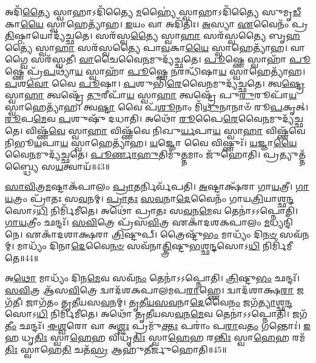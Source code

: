 𑌅𑌦𑌿᳴\-\ul{𑌤𑍍𑌯𑍈} 𑌸𑍍𑌵𑌾𑌹𑌾\-𑌽𑌦𑌿᳴𑌤𑍍𑌯𑍈 \ul{𑌮}\-𑌹𑍍𑌯𑍈॑ 𑌸𑍍𑌵𑌾𑌹𑌾\-𑌽𑌦𑌿᳴𑌤𑍍𑌯𑍈 𑌸𑍁𑌮𑍃\-\ul{𑌡𑍀}\-𑌕𑌾\-\ul{𑌯𑍈} 𑌸𑍍𑌵𑌾𑌹𑍇𑌤𑍍𑌯𑌾᳴𑌹।
\-\ul{𑌇}\-𑌯𑌂 𑌵𑌾 𑌅𑌦𑌿᳴𑌤𑌿𑌃।
\-\ul{𑌅}\-𑌸𑍍𑌯𑌾 \ul{𑌏}\-𑌵𑍈𑌨𑌂᳴ 𑌪𑍍𑌰\-\ul{𑌤𑌿}\-𑌷𑍍𑌠𑌾𑌯𑍋𑌦𑍍𑌯᳴𑌚𑍍𑌛𑌤𑍇।
𑌸𑌰᳴𑌸𑍍𑌵\-\ul{𑌤𑍍𑌯𑍈} 𑌸𑍍𑌵𑌾\-\ul{𑌹𑌾} 𑌸𑌰᳴𑌸𑍍𑌵𑌤𑍍𑌯𑍈 𑌬𑍃\-\ul{𑌹}\-𑌤𑍍𑌯𑍈॑ 𑌸𑍍𑌵𑌾\-\ul{𑌹𑌾} 𑌸𑌰᳴𑌸𑍍𑌵𑌤𑍍𑌯𑍈 𑌪𑌾\-\ul{𑌵}\-𑌕𑌾\-\ul{𑌯𑍈} 𑌸𑍍𑌵𑌾𑌹𑍇𑌤𑍍𑌯𑌾᳴𑌹।
𑌵𑌾𑌗𑍍𑌵𑍈 𑌸𑌰᳴𑌸𑍍𑌵𑌤𑍀।
\-\ul{𑌵𑌾}\-𑌚𑍈𑌵𑍈\-\ul{𑌨}\-𑌮𑍁𑌦𑍍𑌯᳴𑌚𑍍𑌛𑌤𑍇।
\-\ul{𑌪𑍂}\-𑌷𑍍𑌣𑍇 𑌸𑍍𑌵𑌾𑌹𑌾᳴ \ul{𑌪𑍂}\-𑌷𑍍𑌣𑍇 𑌪𑍍𑌰᳴\-\ul{𑌪}\-𑌥𑍍𑌯𑌾᳴\-\ul{𑌯} 𑌸𑍍𑌵𑌾𑌹𑌾᳴ \ul{𑌪𑍂}\-𑌷𑍍𑌣𑍇 \ul{𑌨}\-𑌰𑌨𑍍𑌧𑌿᳴𑌷𑌾\-\ul{𑌯} 𑌸𑍍𑌵𑌾𑌹𑍇𑌤𑍍𑌯𑌾᳴𑌹।
\-\ul{𑌪}\-𑌶\-\ul{𑌵𑍋} 𑌵𑍈 \ul{𑌪𑍂}\-𑌷𑌾।
\-\ul{𑌪}\-𑌶𑍁𑌭𑌿᳴\-\ul{𑌰𑍇}\-𑌵𑍈\-\ul{𑌨}\-𑌮𑍁𑌦𑍍𑌯᳴𑌚𑍍𑌛𑌤𑍇।
𑌤𑍍𑌵\-\ul{𑌷𑍍𑌟𑍍𑌰𑍇} 𑌸𑍍𑌵𑌾\-\ul{𑌹𑌾} 𑌤𑍍𑌵𑌷𑍍𑌟𑍍𑌰𑍇᳴ \ul{𑌤𑍁}\-𑌰𑍀𑌪𑌾᳴\-\ul{𑌯} 𑌸𑍍𑌵𑌾\-\ul{𑌹𑌾} 𑌤𑍍𑌵𑌷𑍍𑌟𑍍𑌰𑍇᳴ 𑌪𑍁\-\ul{𑌰𑍁}\-𑌰𑍂𑌪𑌾᳴\-\ul{𑌯} 𑌸𑍍𑌵𑌾𑌹𑍇𑌤𑍍𑌯𑌾᳴𑌹।
𑌤𑍍𑌵\-\ul{𑌷𑍍𑌟𑌾} 𑌵𑍈 𑌪᳴\-\ul{𑌶𑍂}\-𑌨𑌾𑌂 𑌮𑌿᳴\-\ul{𑌥𑍁}\-𑌨𑌾𑌨𑌾𑍞᳴ 𑌰𑍂\-\ul{𑌪}\-𑌕𑍃𑌤𑍍।
\-\ul{𑌰𑍂}\-𑌪\-\ul{𑌮𑍇}\-𑌵 \ul{𑌪}\-𑌶𑍁𑌷𑍁᳴ 𑌦𑌧𑌾𑌤𑌿।
𑌅𑌥𑍋᳴ \ul{𑌰𑍂}\-𑌪𑍈\-\ul{𑌰𑍇}\-𑌵𑍈\-\ul{𑌨}\-𑌮𑍁𑌦𑍍𑌯᳴𑌚𑍍𑌛𑌤𑍇।
𑌵𑌿𑌷𑍍𑌣᳴\-\ul{𑌵𑍇} 𑌸𑍍𑌵𑌾\-\ul{𑌹𑌾} 𑌵𑌿𑌷𑍍𑌣᳴𑌵𑍇 𑌨𑌿𑌖𑍁\-\ul{𑌰𑍍𑌯}\-𑌪𑌾\-\ul{𑌯} 𑌸𑍍𑌵𑌾\-\ul{𑌹𑌾} 𑌵𑌿𑌷𑍍𑌣᳴𑌵𑍇 𑌨𑌿𑌭𑍂\-\ul{𑌯}\-𑌪𑌾\-\ul{𑌯} 𑌸𑍍𑌵𑌾𑌹𑍇𑌤𑍍𑌯𑌾᳴𑌹।
\-\ul{𑌯}\-𑌜𑍍𑌞𑍋 𑌵𑍈 𑌵𑌿𑌷𑍍𑌣𑍁𑌃᳴।
\-\ul{𑌯}\-𑌜𑍍𑌞𑌾\-\ul{𑌯𑍈}\-𑌵𑍈\-\ul{𑌨}\-𑌮𑍁𑌦𑍍𑌯᳴𑌚𑍍𑌛𑌤𑍇।
\-\ul{𑌪𑍂}\-\-\ul{𑌰𑍍𑌣𑌾}\-\-\ul{𑌹𑍁}\-𑌤𑌿𑌮𑍁᳴\-\ul{𑌤𑍍𑌤}\-𑌮𑌾𑌂 𑌜𑍁᳴𑌹𑍋𑌤𑌿।
𑌪𑍍𑌰𑌤𑍍𑌯𑍁𑌤𑍍𑌤᳴𑌬𑍍𑌧𑍍𑌯𑍈 𑌸\-\ul{𑌯}\-𑌤𑍍𑌵𑌾𑌯᳴॥43॥\anuvakamend[\-\ul{𑌯}\-\-\ul{𑌚𑍍𑌛}\-\-\ul{𑌤𑍇} \ul{𑌪𑍁}\-\-\ul{𑌰𑍁}\-𑌰𑍂𑌪𑌾᳴\-\ul{𑌯} 𑌸𑍍𑌵𑌾𑌹𑍇𑌤𑍍𑌯𑌾᳴\-\ul{𑌹𑌾}\-𑌷𑍍𑌟𑍗 𑌚᳴]

\-\ul{𑌸𑌾}\-\-\ul{𑌵𑌿}\-𑌤𑍍𑌰\-\ul{𑌮}\-𑌷𑍍𑌟𑌾\-𑌕᳴𑌪𑌾𑌲𑌂 \ul{𑌪𑍍𑌰𑌾}\-𑌤𑌰𑍍𑌨𑌿𑌰𑍍𑌵᳴𑌪𑌤𑌿।
\-\ul{𑌅}\-𑌷𑍍𑌟𑌾𑌕𑍍𑌷᳴𑌰𑌾 𑌗𑌾\-\ul{𑌯}\-𑌤𑍍𑌰𑍀।
\-\ul{𑌗𑌾}\-\-\ul{𑌯}\-𑌤𑍍𑌰𑌂 𑌪𑍍𑌰𑌾᳴𑌤𑌃 𑌸\-\ul{𑌵}\-𑌨𑌮𑍍।
\-\ul{𑌪𑍍𑌰𑌾}\-\-\ul{𑌤𑌃} \ul{𑌸}\-\-\ul{𑌵}\-𑌨𑌾\-\ul{𑌦𑍇}\-𑌵𑍈𑌨𑌂᳴ 𑌗𑌾𑌯\-\ul{𑌤𑍍𑌰𑌿}\-𑌯𑌾𑌶𑍍𑌛\-\ul{𑌨𑍍𑌦}\-𑌸𑍋\-𑌽\-\ul{𑌧𑌿} 𑌨𑌿𑌰𑍍𑌮𑌿᳴𑌮𑍀𑌤𑍇।
𑌅𑌥𑍋॑ 𑌪𑍍𑌰𑌾𑌤𑌃 𑌸\-\ul{𑌵}\-𑌨\-\ul{𑌮𑍇}\-𑌵 𑌤𑍇𑌨𑌾॑𑌽𑌽𑌪𑍍𑌨𑍋𑌤𑌿।
\-\ul{𑌗𑌾}\-\-\ul{𑌯}\-𑌤𑍍𑌰𑍀𑌂 𑌛𑌨𑍍𑌦𑌃᳴।
\-\ul{𑌸}\-\-\ul{𑌵𑌿}\-𑌤𑍍𑌰𑍇 𑌪𑍍𑌰᳴𑌸\-\ul{𑌵𑌿}\-𑌤𑍍𑌰 𑌏𑌕𑌾᳴\-𑌦𑌶\-𑌕𑌪𑌾𑌲𑌂 \ul{𑌮}\-𑌧𑍍𑌯𑌨𑍍𑌦𑌿᳴𑌨𑍇।
𑌏𑌕𑌾᳴𑌦𑌶𑌾𑌕𑍍𑌷𑌰𑌾 \ul{𑌤𑍍𑌰𑌿}\-𑌷𑍍𑌟𑍁𑌪𑍍।
𑌤𑍍𑌰𑍈𑌷𑍍𑌟𑍁᳴\-\ul{𑌭𑌂} 𑌮𑌾𑌧𑍍𑌯𑌂᳴ 𑌦𑌿\-\ul{𑌨}\-\-\ul{𑍞} 𑌸𑌵᳴𑌨𑌮𑍍।
𑌮𑌾𑌧𑍍𑌯𑌂᳴ 𑌦𑌿𑌨𑌾\-\ul{𑌦𑍇}\-𑌵𑍈\-\ul{𑌨}\-\-\ul{𑍞} 𑌸𑌵᳴𑌨𑌾\-\ul{𑌤𑍍𑌤𑍍𑌰𑌿}\-𑌷𑍍𑌟𑍁\-\ul{𑌭}\-𑌶𑍍𑌛\-\ul{𑌨𑍍𑌦}\-𑌸𑍋𑌽\-\ul{𑌧𑌿} 𑌨𑌿𑌰𑍍𑌮𑌿᳴𑌮𑍀𑌤𑍇॥44॥

𑌅\-\ul{𑌥𑍋} 𑌮𑌾𑌧𑍍𑌯𑌂᳴ 𑌦𑌿𑌨\-\ul{𑌮𑍇}\-𑌵 𑌸𑌵᳴\-\ul{𑌨𑌂} 𑌤𑍇𑌨𑌾॑𑌽𑌽𑌪𑍍𑌨𑍋𑌤𑌿।
\-\ul{𑌤𑍍𑌰𑌿}\-𑌷𑍍𑌟𑍁\-\ul{𑌭𑌂} 𑌛𑌨𑍍𑌦𑌃᳴।
\-\ul{𑌸}\-\-\ul{𑌵𑌿}\-𑌤𑍍𑌰 𑌆᳴𑌸\-\ul{𑌵𑌿}\-𑌤𑍍𑌰𑍇 𑌦𑍍𑌵𑌾𑌦᳴𑌶𑌕𑌪𑌾𑌲𑌮𑌪\-\ul{𑌰𑌾}\-𑌹𑍍𑌣𑍇।
𑌦𑍍𑌵𑌾𑌦᳴𑌶𑌾𑌕𑍍𑌷\-\ul{𑌰𑌾} 𑌜𑌗᳴𑌤𑍀।
𑌜𑌾𑌗᳴𑌤𑌂 𑌤𑍃𑌤𑍀𑌯𑌸\-\ul{𑌵}\-𑌨𑌮𑍍।
\-\ul{𑌤𑍃}\-\-\ul{𑌤𑍀}\-\-\ul{𑌯}\-\-\ul{𑌸}\-\-\ul{𑌵}\-𑌨𑌾\-\ul{𑌦𑍇}\-𑌵𑍈\-\ul{𑌨𑌂} 𑌜𑌗᳴\-\ul{𑌤𑍍𑌯𑌾}\-𑌶𑍍𑌛\-\ul{𑌨𑍍𑌦}\-𑌸𑍋𑌽\-\ul{𑌧𑌿} 𑌨𑌿𑌰𑍍𑌮𑌿᳴𑌮𑍀𑌤𑍇।
𑌅𑌥𑍋᳴ 𑌤𑍃𑌤𑍀𑌯𑌸\-\ul{𑌵}\-𑌨\-\ul{𑌮𑍇}\-𑌵 𑌤𑍇𑌨𑌾॑𑌽𑌽𑌪𑍍𑌨𑍋𑌤𑌿।
𑌜𑌗᳴\-\ul{𑌤𑍀𑌂} 𑌛𑌨𑍍𑌦𑌃᳴।
\-\ul{𑌈}\-\-\ul{𑌶𑍍𑌵}\-𑌰𑍋 𑌵𑌾 𑌅\-\ul{𑌶𑍍𑌵𑌃} 𑌪𑍍𑌰𑌮𑍁᳴\-\ul{𑌕𑍍𑌤𑌃} 𑌪𑌰𑌾𑌂॑ 𑌪\-\ul{𑌰𑌾}\-𑌵\-\ul{𑌤𑌂} 𑌗𑌨𑍍𑌤𑍋𑌃॑।
\-\ul{𑌇}\-𑌹 𑌧𑍃\-\ul{𑌤𑌿𑌃} 𑌸𑍍𑌵𑌾\-\ul{𑌹𑍇}\-𑌹 𑌵𑌿𑌧𑍃᳴\-\ul{𑌤𑌿𑌃} 𑌸𑍍𑌵𑌾\-\ul{𑌹𑍇}\-𑌹 𑌰\-\ul{𑌨𑍍𑌤𑌿𑌃} 𑌸𑍍𑌵𑌾\-\ul{𑌹𑍇}\-𑌹 𑌰𑌮᳴\-\ul{𑌤𑌿𑌃} 𑌸𑍍𑌵𑌾𑌹𑍇\-\ul{𑌤𑌿} 𑌚𑌤᳴\-\ul{𑌸𑍍𑌰} 𑌆𑌹𑍁᳴𑌤𑍀𑌰𑍍𑌜𑍁𑌹𑍋𑌤𑌿॥45॥

